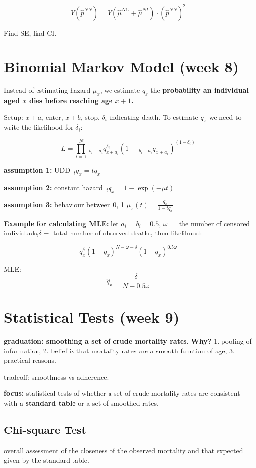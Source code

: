 \documentclass[a4paper]{article}
\begin{document}
$$V(\hat{p}^{\overline{NN}})=V(\hat{\mu}^{NC}+\hat{\mu}^{NT})\cdot(\hat{p}^{\overline{NN}})^2$$

Find SE, find CI.

\section{Binomial Markov Model (week 8)}

Instead of estimating hazard $\mu_x$, we estimate $q_x$ the \textbf{probability an individual aged $x$ dies before reaching age $x+1$.}

Setup: $x+a_i$ enter, $x+b_i$ stop, $\delta_i$ indicating death. To estimate $q_x$ we need to write the likelihood for $\delta_i$:

$$L=\prod^N_{i=1}\ _{b_i-a_i}q_{x+a_i}^{\delta_i}(1-\ _{b_i-a_i}q_{x+a_i})^{(1-\delta_i)}$$

\textbf{assumption 1:} UDD $\ _tq_x=tq_x$

\textbf{assumption 2:} constant hazard $\ _tq_x=1-\exp(-\mu t)$

\textbf{assumption 3:} behaviour between 0, 1 $\mu_x(t)=\frac{q_x}{1-tq_x}$

\textbf{Example for calculating MLE:} let $a_i=b_i=0.5$, $\omega=$ the number of censored individuals,$\delta=$ total number of observed deaths, then likelihood:

$$q^\delta_x(1-q_x)^{N-\omega-\delta}(1-q_x)^{0.5\omega}$$

MLE: $$\hat{q}_x=\frac{\delta}{N-0.5\omega}$$

\section{Statistical Tests (week 9)}

\textbf{graduation: smoothing a set of crude mortality rates}. \textbf{Why?} 1. pooling of information, 2. belief is that mortality rates are a smooth function of age, 3. practical reasons.

tradeoff: smoothness vs adherence. 

\textbf{focus:} statistical tests of whether a set of crude mortality rates are consistent with a \textbf{standard table} or a set of smoothed rates.

\subsection{Chi-square Test}

overall assessment of the closeness of the observed mortality and that expected given by the standard table.
\end{document}
